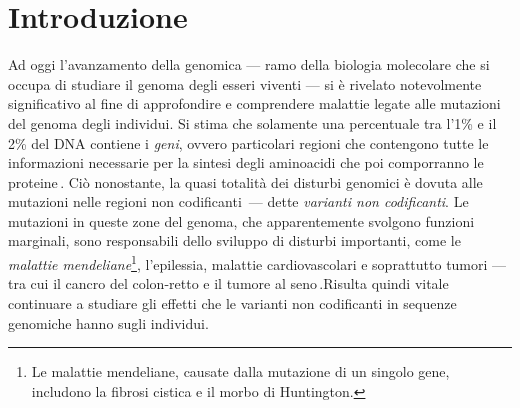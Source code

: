 
\chapter{Introduzione}\label{chp:introduction}

Ad oggi l'avanzamento della genomica — ramo della biologia molecolare che si occupa di studiare il genoma degli esseri viventi — si è rivelato notevolmente significativo al fine di approfondire e comprendere malattie legate alle mutazioni del genoma degli individui. Si stima che solamente una percentuale tra l'1\% e il 2\% del \acs{DNA} contiene i \textsl{geni}, ovvero particolari regioni che contengono tutte le informazioni necessarie per la sintesi degli aminoacidi che poi comporranno le proteine\,\cite{sahu2011identification, pollard2022cell}. Ciò nonostante, la quasi totalità dei disturbi genomici è dovuta alle mutazioni nelle regioni non codificanti\,\cite{zhang2015non} — dette \textsl{varianti non codificanti}. Le mutazioni in queste zone del genoma, che apparentemente svolgono funzioni marginali, sono responsabili dello sviluppo di disturbi importanti, come le \textsl{malattie mendeliane}\footnote{Le malattie mendeliane, causate dalla mutazione di un singolo gene, includono la fibrosi cistica e il morbo di Huntington.}, l'epilessia, malattie cardiovascolari e soprattutto tumori — tra cui il cancro del colon-retto e il tumore al seno\,\cite{french2020role, chial2008mendelian, pagni2022non, kapoor2014enhancer, zhang2015non, khurana2016role, tian2019systematic, bojesen2013multiple, michailidou2017association}.Risulta quindi vitale continuare a studiare gli effetti che le varianti non codificanti in sequenze genomiche hanno sugli individui.

